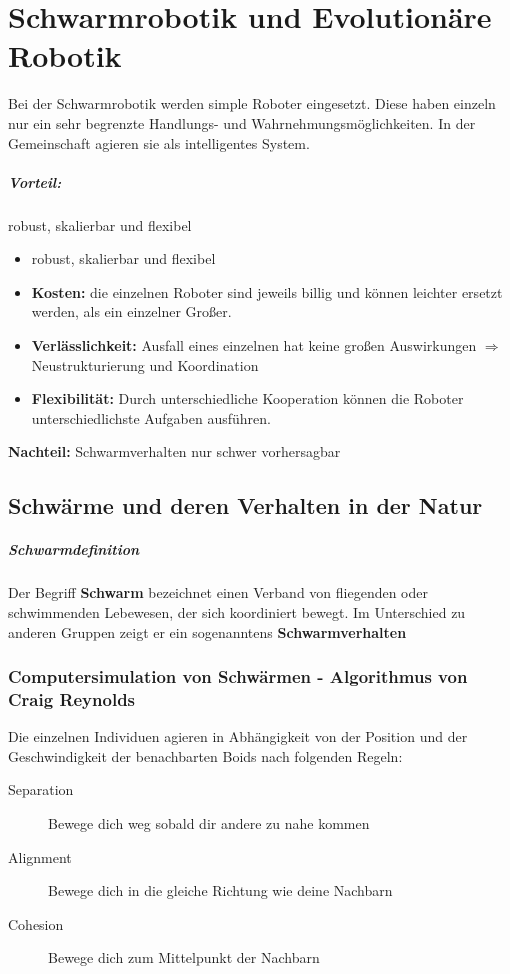 \chapter{Schwarmrobotik und Evolutionäre Robotik}
Bei der Schwarmrobotik werden simple Roboter eingesetzt. Diese haben einzeln
nur ein sehr begrenzte Handlungs- und Wahrnehmungsmöglichkeiten. In der
Gemeinschaft agieren sie als intelligentes System.

\paragraph{Vorteil:} robust, skalierbar und flexibel
\begin{itemize}
	\item robust, skalierbar und flexibel
	\item \textbf{Kosten:} die einzelnen Roboter sind jeweils billig und können
		leichter ersetzt werden, als ein einzelner Großer.
	\item \textbf{Verlässlichkeit:} Ausfall eines einzelnen hat keine großen
		Auswirkungen $\Rightarrow$ Neustrukturierung und Koordination
	\item \textbf{Flexibilität:} Durch unterschiedliche Kooperation können die
		Roboter unterschiedlichste Aufgaben ausführen.
\end{itemize}

\textbf{Nachteil:} Schwarmverhalten nur schwer vorhersagbar

\section{Schwärme  und deren Verhalten in der Natur}
\paragraph{Schwarmdefinition}
Der Begriff \textbf{Schwarm} bezeichnet einen Verband von fliegenden oder
schwimmenden Lebewesen, der sich koordiniert bewegt. Im Unterschied zu anderen
Gruppen zeigt er ein sogenanntens \textbf{Schwarmverhalten}

\subsection{Computersimulation von Schwärmen - Algorithmus von Craig Reynolds}
Die einzelnen Individuen agieren in Abhängigkeit von der Position und der
Geschwindigkeit der benachbarten Boids nach folgenden Regeln:
\begin{description}
	\item[Separation] Bewege dich weg sobald dir andere zu nahe kommen
	\item[Alignment] Bewege dich in die gleiche Richtung wie deine Nachbarn
	\item[Cohesion] Bewege dich zum Mittelpunkt der Nachbarn
\end{description}

